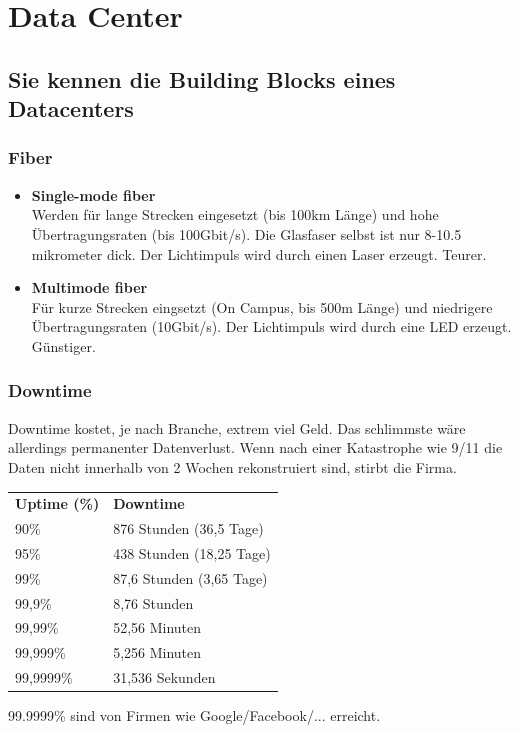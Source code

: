 \chapter{Data Center}

\section{Sie kennen die Building Blocks eines Datacenters}

\subsection{Fiber}
\begin{itemize}
	\item \textbf{Single-mode fiber}\\
		Werden für lange Strecken eingesetzt (bis 100km Länge) und hohe Übertragungsraten (bis 100Gbit/s). Die Glasfaser selbst ist nur 8-10.5 mikrometer dick. Der Lichtimpuls wird durch einen Laser erzeugt. Teurer.
	\item \textbf{Multimode fiber}\\
	Für kurze Strecken eingsetzt (On Campus, bis 500m Länge) und niedrigere Übertragungsraten (10Gbit/s). Der Lichtimpuls wird durch eine LED erzeugt. Günstiger.
\end{itemize}

\subsection{Downtime}
Downtime kostet, je nach Branche, extrem viel Geld. Das schlimmste wäre allerdings permanenter Datenverlust. Wenn nach einer Katastrophe wie 9/11 die Daten nicht innerhalb von 2 Wochen rekonstruiert sind, stirbt die Firma.
\begin{table}[h]
	\begin{tabular}{ll}
		\textbf{Uptime (\%)} & \textbf{Downtime}        \\
		90\%                 & 876 Stunden (36,5 Tage)  \\
		95\%                 & 438 Stunden (18,25 Tage) \\
		99\%                 & 87,6 Stunden (3,65 Tage) \\
		99,9\%               & 8,76 Stunden             \\
		99,99\%              & 52,56 Minuten            \\
		99,999\%             & 5,256 Minuten            \\
		99,9999\%            & 31,536 Sekunden         
		\end{tabular}
		\end{table}
		99.9999\% sind von Firmen wie Google/Facebook/... erreicht.

